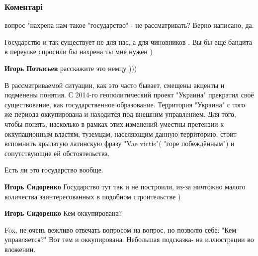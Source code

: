  
 
 
 
 
\subsubsection{Коментарі}

\begin{itemize} %

вопрос "нахрена нам такое "государство" - не рассматривать?
Верно написано, да.

\begin{itemize} %

Государство и так существует не для нас, а для чиновников . Вы бы ещё бандита в
переулке спросили бы нахрена ты мне нужен )

\textbf{Игорь Потысьев} расскажите это немцу )))


В рассматриваемой ситуации, как это часто бывает, смещены акценты и подменены
понятия. С 2014-го геополитический проект "Украина" прекратил своё
существование, как государственное образование. Территория "Украина" с того же
периода оккупирована и находится под внешним управлением. Для того, чтобы
понять, насколько в рамках этих изменений уместны претензии к оккупационным
властям, туземцам, населяющим данную территорию, стоит вспомнить крылатую
латинскую фразу "Vae victis"( "горе побеждённым") и сопутствующие ей
обстоятельства.

Есть ли это государство вообще.

\textbf{Игорь Сидоренко} Государство тут так и не построили, из-за ничтожно малого количества заинтересованных в подобном строительстве )

\textbf{Игорь Сидоренко} Кем оккупирована?


Fox, не очень вежливо отвечать вопросом на вопрос, но позволю себе: "Кем
управляется?" Вот тем и оккупирована. Небольшая подсказка- на иллюстрации во
вложении.


\end{itemize}
\end{itemize}
